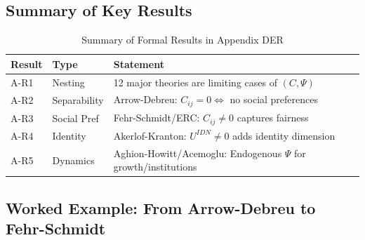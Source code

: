 

\subsection{Summary of Key Results}
\label{sec:A-results}

\begin{table}[htbp]
\centering
\caption{Summary of Formal Results in Appendix DER}
\label{tab:A-results}
\renewcommand{\arraystretch}{1.2}
\begin{tabular}{@{}llp{7cm}@{}}
\toprule
\textbf{Result} & \textbf{Type} & \textbf{Statement} \\
\midrule
A-R1 & Nesting & 12 major theories are limiting cases of $(C, \Psi)$ \\
A-R2 & Separability & Arrow-Debreu: $C_{ij} = 0 \Leftrightarrow$ no social preferences \\
A-R3 & Social Pref & Fehr-Schmidt/ERC: $C_{ij} \neq 0$ captures fairness \\
A-R4 & Identity & Akerlof-Kranton: $U^{IDN} \neq 0$ adds identity dimension \\
A-R5 & Dynamics & Aghion-Howitt/Acemoglu: Endogenous $\Psi$ for growth/institutions \\
\bottomrule
\end{tabular}
\end{table}


\subsection{Worked Example: From Arrow-Debreu to Fehr-Schmidt}
\label{sec:A-example}

